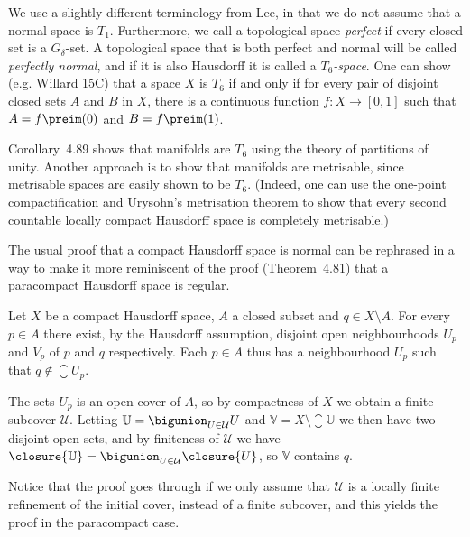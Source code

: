 \documentclass[article, a4paper, 11pt, oneside]{memoir}
\numberwithin{equation}{chapter}
\theoremstyle{nonumberplain}
\newcommand{\calU}{\mathcal{U}}
\begin{document}
\begin{remarkbreak}
    We use a slightly different terminology from Lee, in that we do not assume that a normal space is $T_1$. Furthermore, we call a topological space \emph{perfect} if every closed set is a $G_\delta$-set. A topological space that is both perfect and normal will be called \emph{perfectly normal}, and if it is also Hausdorff it is called a \emph{$T_6$-space}. One can show (e.g. Willard 15C) that a space $X$ is $T_6$ if and only if for every pair of disjoint closed sets $A$ and $B$ in $X$, there is a continuous function $f \colon X \to [0,1]$ such that $A = f\preim(0)$ and $B = f\preim(1)$.
    
    Corollary~4.89 shows that manifolds are $T_6$ using the theory of partitions of unity. Another approach is to show that manifolds are metrisable, since metrisable spaces are easily shown to be $T_6$. (Indeed, one can use the one-point compactification and Urysohn's metrisation theorem to show that every second countable locally compact Hausdorff space is completely metrisable.)
\end{remarkbreak}


\newcommand{\bbU}{\mathbb{U}}
\newcommand{\bbV}{\mathbb{V}}

\begin{remarkbreak}
    The usual proof that a compact Hausdorff space is normal can be rephrased in a way to make it more reminiscent of the proof (Theorem~4.81) that a paracompact Hausdorff space is regular.

    Let $X$ be a compact Hausdorff space, $A$ a closed subset and $q \in X \setminus A$. For every $p \in A$ there exist, by the Hausdorff assumption, disjoint open neighbourhoods $U_p$ and $V_p$ of $p$ and $q$ respectively. Each $p \in A$ thus has a neighbourhood $U_p$ such that $q \not\in \closure{U}_p$.
    
    The sets $U_p$ is an open cover of $A$, so by compactness of $X$ we obtain a finite subcover $\calU$. Letting $\bbU = \bigunion_{U \in \calU} U$ and $\bbV = X \setminus \closure{\bbU}$ we then have two disjoint open sets, and by finiteness of $\calU$ we have $\closure{\bbU} = \bigunion_{U \in \calU} \closure{U}$, so $\bbV$ contains $q$.

    Notice that the proof goes through if we only assume that $\calU$ is a locally finite refinement of the initial cover, instead of a finite subcover, and this yields the proof in the paracompact case.
\end{remarkbreak}
\end{document}

